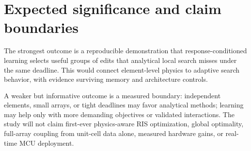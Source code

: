 \documentclass[conference]{IEEEtran}
\begin{document}
\section{Expected significance and claim boundaries}
The strongest outcome is a reproducible demonstration that response-conditioned learning selects useful groups of edits that analytical local search misses under the same deadline. This would connect element-level physics to adaptive search behavior, with evidence surviving memory and architecture controls.

A weaker but informative outcome is a measured boundary: independent elements, small arrays, or tight deadlines may favor analytical methods; learning may help only with more demanding objectives or validated interactions. The study will not claim first-ever physics-aware RIS optimization, global optimality, full-array coupling from unit-cell data alone, measured hardware gains, or real-time MCU deployment.


\end{document}

